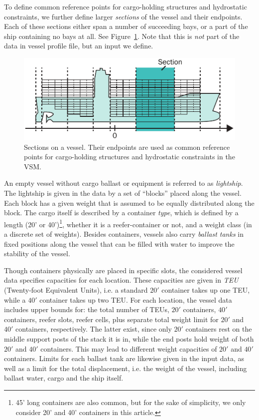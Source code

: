 To define common reference points for cargo-holding structures and hydrostatic constraints, we further define larger \emph{sections} of the vessel and their endpoints. Each of these sections either span a number of succeeding bays, or a part of the ship containing no bays at all.
See Figure~\ref{fig:sectionEndPoints}. {Note that this is \emph{not} part of the data in vessel profile file, but an input we define.} 

\begin{figure}[hb]
	\centering
		\includegraphics{figures/sectionEndPoints.pdf}
	\caption{Sections on a vessel. Their endpoints are used as common reference points for cargo-holding structures and hydrostatic constraints in the VSM.}
	\label{fig:sectionEndPoints}
\end{figure}

An empty vessel without cargo ballast or equipment is referred to as \emph{lightship}.  The lightship is given in the data by a set of ``blocks'' placed along the vessel. Each block has a given weight that is assumed to be equally distributed along the block.
%
The cargo itself is described by a container \emph{type}, which is defined by a length (20' or 40')\footnote{45' long containers are also common, but for the sake of simplicity, we only consider 20' and 40' containers in this article.}, whether it is a reefer-container or not, and a weight class (in a discrete set of weights). 
Besides containers, vessels also carry \emph{ballast tanks} in fixed positions along the vessel that can be filled with water to improve the stability of the vessel.

Though containers physically are placed in specific slots, the considered vessel data specifies capacities for each location. These capacities are given in \emph{TEU} (Twenty-foot Equivalent Units), i.e. a standard $20'$ container takes up one TEU, while a $40'$ container takes up two TEU. For each location, the vessel data includes upper bounds for: the total number of TEUs, $20'$ containers, $40'$ containers, reefer slots, reefer cells, plus separate total weight limit for $20'$ and $40'$ containers, respectively. The latter exist, since only $20'$ containers rest on the middle support posts of the stack it is in, while the end posts hold weight of both $20'$ and $40'$ containers. This may lead to different weight capacities of $20'$ and $40'$ containers.
%
Limits for each ballast tank are likewise given in the input data, as well as a limit for the total displacement, i.e. the weight of the vessel, including ballast water, cargo and the ship itself. 

